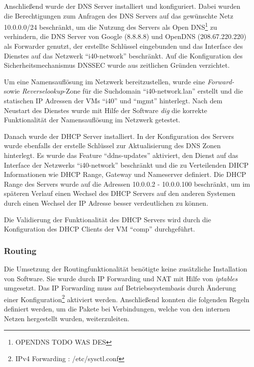 Anschließend wurde der \ac{DNS} Server installiert und konfiguriert. Dabei wurden die Berechtigungen zum Anfragen des \ac{DNS} Servers auf das gewünschte Netz 10.0.0.0/24 beschränkt, um die Nutzung des Servers als Open \ac{DNS}\footnote{OPENDNS TODO WAS DES} zu verhindern, die \ac{DNS} Server von Google (8.8.8.8) und OpenDNS (208.67.220.220) als Forwarder genutzt, der erstellte Schlüssel eingebunden und das Interface des Dienstes auf das Netzwerk "`i40-network"' beschränkt. Auf die Konfiguration des Sicherheitsmechanismus DNSSEC wurde aus zeitlichen Gründen verzichtet.

Um eine Namensauflösung im Netzwerk bereitzustellen, wurde eine \textit{Forward-} sowie \textit{Reverselookup}-Zone für die Suchdomain "`i40-network.lan"' erstellt und die statischen \ac{IP} Adressen der \ac{VM}s "`i40"' und "`mgmt"' hinterlegt. Nach dem Neustart des Dienstes wurde mit Hilfe der Software \textit{dig} die korrekte Funktionalität der Namensauflösung im Netzwerk getestet.

Danach wurde der \ac{DHCP} Server installiert. In der Konfiguration des Servers wurde ebenfalls der erstelle Schlüssel zur Aktualisierung des \ac{DNS} Zonen hinterlegt. Es wurde das Feature "`ddns-updates"' aktiviert, den Dienst auf das Interface der Netzwerks "`i40-network"' beschränkt und die zu Verteilenden \ac{DHCP} Informationen wie \ac{DHCP} Range, Gateway und Nameserver definiert. Die \ac{DHCP} Range des Servers wurde auf die Adressen 10.0.0.2 - 10.0.0.100 beschränkt, um im späteren Verlauf einen Wechsel des \ac{DHCP} Servers auf den anderen Systemen durch einen Wechsel der \ac{IP} Adresse besser verdeutlichen zu können.

Die Validierung der Funktionalität des \ac{DHCP} Servers wird durch die Konfiguration des \ac{DHCP} Clients der \ac{VM} "`comp"' durchgeführt.

\subsubsection{Routing}
Die Umsetzung der Routingfunktionalität benötigte keine zusätzliche Installation von Software. Sie wurde durch \ac{IP} Forwarding und \ac{NAT} mit Hilfe von \textit{iptables} umgesetzt. Das \ac{IP} Forwarding muss auf Betriebssystembasis durch Änderung einer Konfiguration\footnote{IPv4 Forwarding : /etc/sysctl.conf} aktiviert werden. Anschließend konnten die folgenden Regeln definiert werden, um die Pakete bei Verbindungen, welche von den internen Netzen hergestellt wurden, weiterzuleiten.

